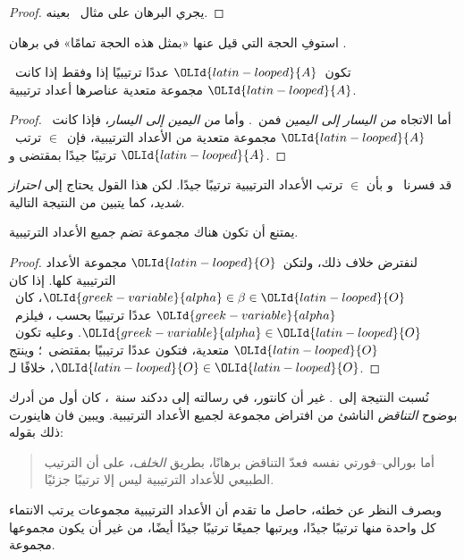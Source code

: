\documentclass[../../../include/open-logic-section]{subfiles}
\begin{document}
\begin{proof}
يجري البرهان على مثال~ بعينه.
\end{proof}

\begin{prob}
استوفِ الحجة التي قيل عنها «بمثل هذه الحجة تمامًا» في برهان
.
\end{prob}

\begin{cor}
تكون~${\OLId{latin-looped}{A}}$ عددًا ترتيبيًا إذا وفقط إذا كانت~${\OLId{latin-looped}{A}}$ مجموعة متعدية عناصرها
أعداد ترتيبية.
\end{cor}

\begin{proof}
أما الاتجاه \emph{من اليسار إلى اليمين} فمن~.
وأما \emph{من اليمين إلى اليسار}، فإذا كانت~${\OLId{latin-looped}{A}}$ مجموعة متعدية من
الأعداد الترتيبية، فإن~$\in$ ترتب~${\OLId{latin-looped}{A}}$ ترتيبًا جيدًا بمقتضى
 و.
\end{proof}

قد فسرنا~ و بأن
$\in$ ترتب الأعداد الترتيبية ترتيبًا جيدًا. لكن هذا القول يحتاج إلى
\emph{احتراز شديد}، كما يتبين من النتيجة التالية.

\begin{thm}
يمتنع أن تكون هناك مجموعة تضم جميع الأعداد الترتيبية.
\end{thm}

\begin{proof}
لنفترض خلاف ذلك، ولتكن~${\OLId{latin-looped}{O}}$ مجموعة الأعداد الترتيبية كلها. إذا كان
${\OLId{greek-variable}{alpha}} \in \beta \in {\OLId{latin-looped}{O}}$، كان~${\OLId{greek-variable}{alpha}}$ عددًا ترتيبيًا بحسب
، فيلزم~${\OLId{greek-variable}{alpha}} \in {\OLId{latin-looped}{O}}$. وعليه تكون~${\OLId{latin-looped}{O}}$ متعدية،
فتكون عددًا ترتيبيًا بمقتضى~؛ وينتج
${\OLId{latin-looped}{O}} \in {\OLId{latin-looped}{O}}$، خلافًا لـ.
\end{proof}
\noindent
نُسبت النتيجة إلى~\citeauthor{Burali-Forti1897}. غير أن كانتور، في
رسالته إلى ددكند سنة~، كان أول من أدرك بوضوح \emph{التناقض}
الناشئ من افتراض مجموعة لجميع الأعداد الترتيبية. ويبين فان هاينورت ذلك بقوله:
\begin{quote}
أما بورالي--فورتي نفسه فعدّ التناقض برهانًا، بطريق \emph{الخلف}،
على أن الترتيب الطبيعي للأعداد الترتيبية ليس إلا ترتيبًا جزئيًا.
\citep[p.~105]{Heijenoort1967}
\end{quote}
وبصرف النظر عن خطئه، حاصل ما تقدم أن الأعداد الترتيبية مجموعات
يرتب الانتماء كل واحدة منها ترتيبًا جيدًا، ويرتبها جميعًا ترتيبًا
جيدًا أيضًا، من غير أن يكون مجموعها مجموعة.
\end{document}
